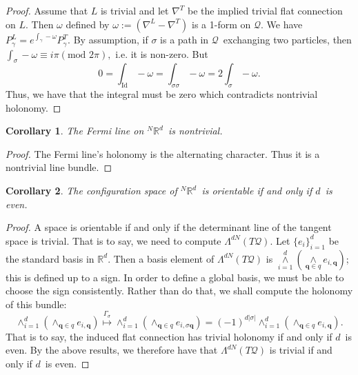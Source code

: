 \documentclass[11pt]{article}
\newtheorem{cor}{Corollary}
\theoremstyle{remark}
\begin{document}
\begin{proof}
Assume that $L$ is trivial and let $\nabla^T$ be the implied trivial flat
connection on $L$.  Then $\omega$ defined by 
$\omega \ensuremath{:=} (\nabla^L - \nabla^T)$  is a 1-form on \ensuremath{\mathcal{Q}}. We have 
$P_{\gamma}^L = e^{\int_{\gamma} -\omega}P_{\gamma}^T $. 
By
assumption, if $\ensuremath{\sigma}$ is a path in \ensuremath{\mathcal{Q}}\ exchanging two
particles, then ${\int_{\ensuremath{\sigma}} -\omega} \equiv i \pi (\text{mod }
2\pi),$ i.e. it is non-zero.  But 
\[
0 
= \int_{\text{Id}} -\omega 
= \int_{\ensuremath{\sigma}\ensuremath{\sigma}} -\omega 
= 2 \int_{\ensuremath{\sigma}} -\omega. 
\]
Thus, we have that the integral must be zero which contradicts
nontrivial holonomy.
\end{proof}
 
\begin{cor}
The Fermi line on \ensuremath{{}^N\ensuremath{\mathbb{R}^{\ensuremath{d}}}}\ is nontrivial. 
\end{cor}

\begin{proof}
The Fermi line's holonomy is the alternating character. Thus it is
a nontrivial line bundle.
\end{proof}

\begin{cor}
The configuration space of \ensuremath{{}^N\ensuremath{\mathbb{R}^{\ensuremath{d}}}}\ is orientable if and only if \ensuremath{d}\ is
even. 
\end{cor}

\begin{proof}
A space is orientable if and only if the determinant line of the
tangent space is trivial. That is to say, we need to compute
$\Lambda^{\ensuremath{d} N} (T\ensuremath{\mathcal{Q}})$. Let $\{e_i\}_{i=1}^{\ensuremath{d}}$ be the standard
basis in \ensuremath{\mathbb{R}^{\ensuremath{d}}}. Then a basis element of $\Lambda^{\ensuremath{d} N}
(T\ensuremath{\mathcal{Q}})$ is $\mathop{\wedge}\limits_{i=1}^{\ensuremath{d}} (\mathop{\wedge}\limits_{\ensuremath{\boldsymbol{q}} \in
\ensuremath{q}} e_{i,\ensuremath{\boldsymbol{q}}}) $; this is defined up to a sign. In order to
define a global basis, we must be able to choose the sign
consistently. Rather than do that, we shall compute the holonomy of
this bundle:
\[
 \mathop{\wedge}_{i=1}^{\ensuremath{d}} (\mathop{\wedge}_{\ensuremath{\boldsymbol{q}} \in \ensuremath{q}} e_{i,\ensuremath{\boldsymbol{q}}}) 
\overset{\ensuremath{\Gamma_{\ensuremath{\sigma}}}}{\mapsto}  
\mathop{\wedge}_{i=1}^{\ensuremath{d}} (\mathop{\wedge}_{\ensuremath{\boldsymbol{q}} \in \ensuremath{q}} e_{i,\ensuremath{\sigma}\ensuremath{\boldsymbol{q}}})  
= (-1)^{\ensuremath{d} |\ensuremath{\sigma}|}\mathop{\wedge}_{i=1}^{\ensuremath{d}} (\mathop{\wedge}_{\ensuremath{\boldsymbol{q}} \in \ensuremath{q}} e_{i,\ensuremath{\boldsymbol{q}}}).
\]
That is to say, the induced flat connection has trivial holonomy if
and only if \ensuremath{d}\ is even. By the above results, we therefore have that 
$\Lambda^{\ensuremath{d} N} (T\ensuremath{\mathcal{Q}})$ is trivial if and only if \ensuremath{d}\ is
even. 
\end{proof}
\end{document}
